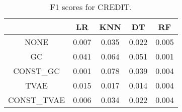 \begin{table}
\caption{F1 scores for CREDIT.}
\label{tab:f1-CREDIT}
\begin{tabular}{ccccc}
\toprule
 & LR & KNN & DT & RF \\
\midrule
NONE & 0.007 & 0.035 & 0.022 & 0.005 \\
GC & 0.041 & 0.064 & 0.051 & 0.001 \\
CONST\_GC & 0.001 & 0.078 & 0.039 & 0.004 \\
TVAE & 0.015 & 0.017 & 0.014 & 0.004 \\
CONST\_TVAE & 0.006 & 0.034 & 0.022 & 0.004 \\
\bottomrule
\end{tabular}
\end{table}

